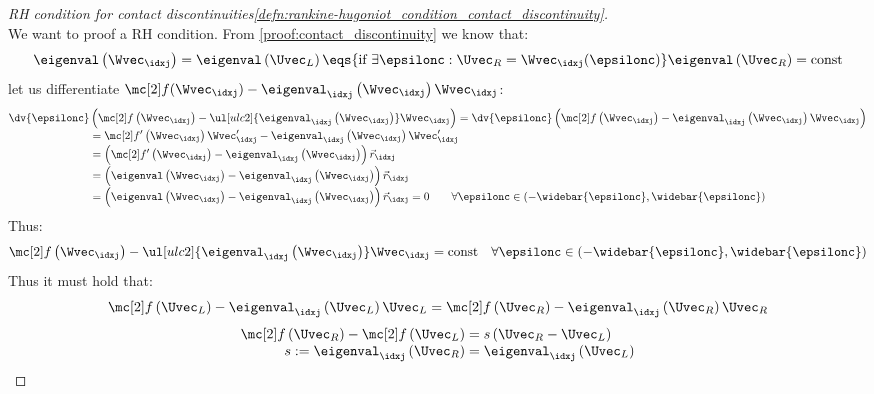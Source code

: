 \begin{proofbox}\nospacing
    \begin{proof}[RH condition for contact discontinuities\cref{defn:rankine-hugoniot_condition_contact_discontinuity}]
        \label{proof:defn:rankine-hugoniot_condition_contact_discontinuity}\leavevmode\\
        We want to proof a RH condition. From \cref{proof:contact_discontinuity} we know that:
        \begin{align*}
          \eigenval\left(\Wvec_{\idxj}\right)=\eigenval\left(\Uvec_{L}\right)\eqs{\text{if }\exists\epsilonc:\Uvec_{R}=\Wvec_{\idxj}(\epsilonc)}
          \eigenval\left(\Uvec_{R}\right)=\text{const}
        \end{align*}
        let us differentiate $\flux(\Wvec_{\idxj})-\eigenval_{\idxj} \left(\Wvec_{\idxj}\right)\Wvec_{\idxj}$:
        \begin{align*}
          \dv{\epsilonc}&\left(\flux\left(\Wvec_{\idxj}\right)-\ul[ulc2]{\eigenval_{\idxj} \left(\Wvec_{\idxj}\right)}\Wvec_{\idxj}\right)
          =\dv{\epsilonc}\left(\flux\left(\Wvec_{\idxj}\right)-\eigenval_{\idxj} \left(\Wvec_{\idxj}\right)\Wvec_{\idxj}\right)\\[-1\jot]
          &=\flux'\left(\Wvec_{\idxj}\right)\Wvec'_{\idxj}-\eigenval_{\idxj} \left(\Wvec_{\idxj}\right)\Wvec'_{\idxj}\\[-1\jot]
          &=\left(\flux'\left(\Wvec_{\idxj}\right)-\eigenval_{\idxj} \left(\Wvec_{\idxj}\right)\right)\vec{r}_{\idxj}\\[-1\jot]
          &=\left(\eigenval\left(\Wvec_{\idxj}\right)-\eigenval_{\idxj} \left(\Wvec_{\idxj}\right)\right)\vec{r}_{\idxj}\\[-1\jot]
          &=\left(\eigenval\left(\Wvec_{\idxj}\right)-\eigenval_{\idxj} \left(\Wvec_{\idxj}\right)\right)\vec{r}_{\idxj}=0\qquad\forall\epsilonc\in(-\widebar{\epsilonc},\widebar{\epsilonc})
        \end{align*}
        Thus:
        \begin{align*}
          \flux\left(\Wvec_{\idxj}\right)-\ul[ulc2]{\eigenval_{\idxj} \left(\Wvec_{\idxj}\right)}\Wvec_{\idxj}=\text{const}&&\forall\epsilonc\in(-\widebar{\epsilonc},\widebar{\epsilonc})
        \end{align*}
        Thus it must hold that:
        \begin{align*}
          \flux\left(\Uvec_{L}\right)-\eigenval_{\idxj} \left(\Uvec_{L}\right)\Uvec_{L}
          =\flux\left(\Uvec_{R}\right)-\eigenval_{\idxj} \left(\Uvec_{R}\right)\Uvec_{R}
        \end{align*}
        \begin{align*}
          \flux\left(\Uvec_{R}\right)-\flux\left(\Uvec_{L}\right)
          &=s \left(\Uvec_{R}-\Uvec_{L}\right)\quad \\[-1\jot]
          s:=\eigenval_{\idxj} \left(\Uvec_{R}\right)&=\eigenval_{\idxj} \left(\Uvec_{L}\right)
        \end{align*}
    \end{proof}
\end{proofbox}
